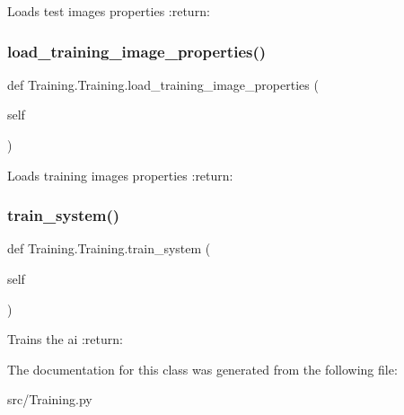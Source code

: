 \begin{DoxyVerb}Loads test images properties
:return:
\end{DoxyVerb}
 \mbox{\label{class_training_1_1_training_a910d50cee577997808b934c6ef0d5a31}} 
\subsubsection{\texorpdfstring{load\+\_\+training\+\_\+image\+\_\+properties()}{load\_training\_image\_properties()}}
{\footnotesize\ttfamily def Training.\+Training.\+load\+\_\+training\+\_\+image\+\_\+properties (\begin{DoxyParamCaption}\item[{}]{self }\end{DoxyParamCaption})}

\begin{DoxyVerb}Loads training images properties
:return:
\end{DoxyVerb}
 \mbox{\label{class_training_1_1_training_ae08acd1661b3b8d7b7b12a9648abe876}} 
\subsubsection{\texorpdfstring{train\+\_\+system()}{train\_system()}}
{\footnotesize\ttfamily def Training.\+Training.\+train\+\_\+system (\begin{DoxyParamCaption}\item[{}]{self }\end{DoxyParamCaption})}

\begin{DoxyVerb}Trains the ai
:return:
\end{DoxyVerb}
 

The documentation for this class was generated from the following file\+:\begin{DoxyCompactItemize}
\item 
src/Training.\+py\end{DoxyCompactItemize}
